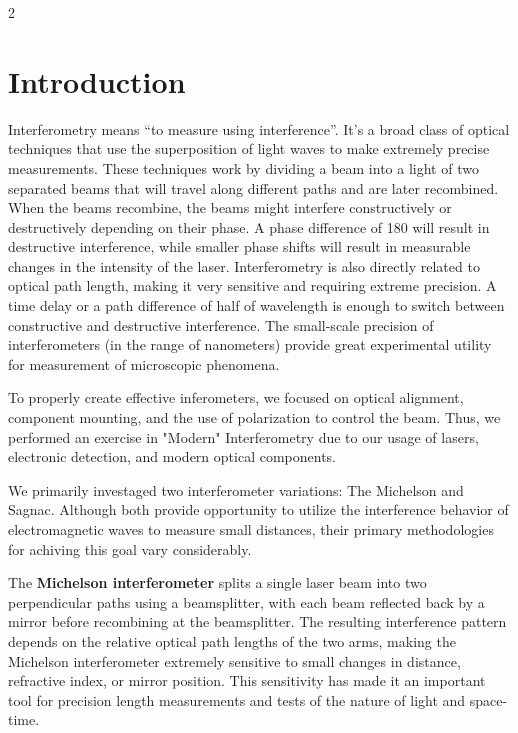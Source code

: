 \documentclass[fontsize=10pt]{article}
\begin{document}
\begin{multicols}{2}


\section{Introduction}
    Interferometry means “to measure using interference”. It’s a broad class of optical techniques that use the superposition of light waves to make extremely precise measurements. These techniques work by dividing a beam into a light of two separated beams that will travel along different paths and are later recombined. When the beams recombine, the beams might interfere constructively or destructively depending on their phase. A phase difference of 180 will result in destructive interference, while smaller phase shifts will result in measurable changes in the intensity of the laser. Interferometry is also directly related to optical path length, making it very sensitive and requiring extreme precision. A time delay or a path difference of half of wavelength is enough to switch between constructive and destructive interference. The small-scale precision of interferometers (in the range of nanometers) provide great experimental utility for measurement of microscopic phenomena. 
    
To properly create effective inferometers, we focused on optical alignment, component mounting, and the use of polarization to control the beam. Thus, we performed an exercise in "Modern" Interferometry due to our usage of lasers, electronic detection, and modern optical components.

We primarily investaged two interferometer variations: The Michelson and Sagnac. Although both provide opportunity to utilize the interference behavior of electromagnetic waves to measure small distances, their primary methodologies for achiving this goal vary considerably.

 	The \textbf{Michelson interferometer} splits a single laser beam into two perpendicular paths using a beamsplitter, with each beam reflected back by a mirror before recombining at the beamsplitter. The resulting interference pattern depends on the relative optical path lengths of the two arms, making the Michelson interferometer extremely sensitive to small changes in distance, refractive index, or mirror position. This sensitivity has made it an important tool for precision length measurements and tests of the nature of light and space-time.
    

\end{multicols}
\end{document}
